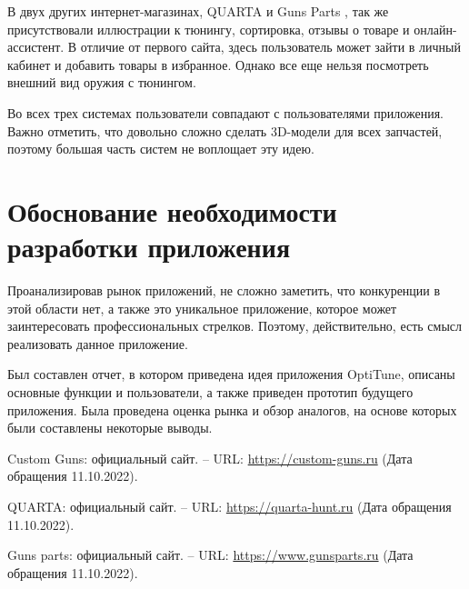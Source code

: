 \documentclass[14pt]{extreport}
\begin{document}
В двух других интернет-магазинах, QUARTA \cite{bib2} и Guns Parts \cite{bib3}, так же присутствовали иллюстрации к тюнингу, сортировка, отзывы о товаре и онлайн-ассистент. В отличие от первого сайта, здесь пользователь может зайти в личный кабинет и добавить товары в избранное. Однако все еще нельзя посмотреть внешний вид оружия с тюнингом. 

Во всех трех системах пользователи совпадают с пользователями приложения. Важно отметить, что довольно сложно сделать 3D-модели для всех запчастей, поэтому большая часть систем не воплощает эту идею. 


\newpage
\section{Обоснование необходимости разработки приложения}

Проанализировав рынок приложений, не сложно заметить, что конкуренции в этой области нет, а также это уникальное приложение, которое может заинтересовать профессиональных стрелков. Поэтому, действительно, есть смысл реализовать данное приложение.


\conclusions

Был составлен отчет, в котором приведена идея приложения OptiTune, описаны основные функции и пользователи, а также приведен прототип будущего приложения. Была проведена оценка рынка и обзор аналогов, на основе которых были составлены некоторые выводы.



\newpage
\begin{thebibliography}{99}

 Custom Guns: официальный сайт. – URL: \url{https://custom-guns.ru} (Дата обращения 11.10.2022).

 QUARTA: официальный сайт. – URL: \url{https://quarta-hunt.ru} (Дата обращения 11.10.2022).

 Guns parts: официальный сайт. – URL: \url{https://www.gunsparts.ru} (Дата обращения 11.10.2022).



\end{thebibliography}
\end{document}
